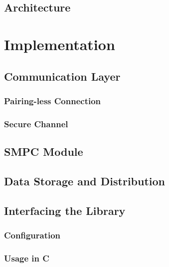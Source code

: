 	\section{Architecture}
	

\chapter{Implementation }	

	
	\section{Communication Layer}
	
			\subsection*{Pairing-less Connection}
			
			\subsection*{Secure Channel}
			
	\section{\gls{SMPC} Module}
	
	\section{Data Storage and Distribution}
	
	\section{Interfacing the Library}
	
		\subsection*{Configuration}
		
		\subsection*{Usage in C}
		
